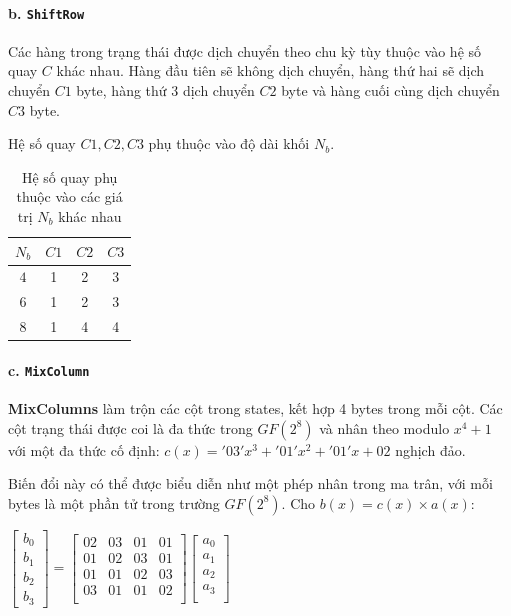\paragraph{b. \texttt{ShiftRow}}\quad

Các hàng trong trạng thái được dịch chuyển theo chu kỳ tùy thuộc vào hệ số quay $C$ khác nhau. Hàng đầu tiên sẽ không dịch chuyển, hàng thứ hai sẽ dịch chuyển $C1$ byte, hàng thứ 3 dịch chuyển $C2$ byte và hàng cuối cùng dịch chuyển $C3$ byte.

Hệ số quay $C1, C2, C3$ phụ thuộc vào độ dài khối $N_b$. 
\begin{table}[h]
	\centering
	\caption{Hệ số quay phụ thuộc vào các giá trị $N_b$ khác nhau}
	\begin{tabular}{|c|c|c|c|}
		\hline
		$N_b$ & $C1$ & $C2$ & $C3$ \\ \hline
		$4$ & 1 & 2 & 3 \\ \hline
		$6$ & 1 & 2 & 3 \\ \hline
		$8$ & 1 & 4 & 4 \\ \hline
	\end{tabular}
\end{table}

\paragraph{c. \texttt{MixColumn}}\quad

\textbf{MixColumns} làm trộn các cột trong states, kết hợp 4 bytes trong mỗi cột. 
Các cột trạng thái được coi là đa thức trong $GF(2^8)$ và nhân theo modulo $x^4+1$ với một đa thức cố định: $c(x)='03'x^3+'01'x^2+'01'x+02$ nghịch đảo.

Biến đổi này có thể được biểu diễn như một phép nhân trong ma trân, với mỗi bytes là một phần tử trong trường $GF(2^8)$. Cho $b(x) = c(x) \times a(x)$:
\begin{center}
	$\begin{bmatrix} b_0 \\ b_1 \\b_2 \\ b_3\end{bmatrix} =
	\begin{bmatrix}
		02 & 03 & 01 & 01 \\
		01 & 02 & 03 & 01 \\
		01 & 01 & 02 & 03\\
		03 & 01 & 01 & 02 \\
	\end{bmatrix}
	\begin{bmatrix} a_0 \\ a_1 \\ a_2 \\ a_3 \\ \end{bmatrix}$
\end{center}

